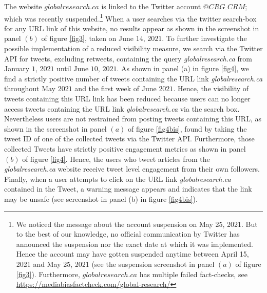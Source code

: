 \documentclass{article}
\begin{document}
\smallskip




The website $globalresearch.ca$ is linked to the Twitter account {$@CRG\_CRM$}; which was recently suspended.\footnote{We noticed the message about the account suspension on May 25, 2021. But to the best of our knowledge, no official communication by Twitter has announced the suspension nor the exact date at which it was implemented. Hence the account may have gotten suspended anytime between April 15, 2021 and May 25, 2021 (see the suspension screenshot in panel $(a)$ of figure \ref{fig3}). Furthermore, $globalresearch.ca$ has multiple failed fact-checks, see \href{https://mediabiasfactcheck.com/global-research/}{https://mediabiasfactcheck.com/global-research/}} When a user searches via the twitter search-box for any URL link of this website, no results appear as shown in the screenshot in panel $(b)$ of figure \ref{fig3}, taken on June $14$, $2021$. To further investigate the possible implementation of a reduced visibility measure, we search via the Twitter API for tweets, excluding retweets, containing the query {\it globalresearch.ca} from January $1$, $2021$ until June $10$, $2021$.  As shown in panel (a) in figure \ref{fig4}, we find a strictly positive number of tweets containing the URL link {\it globalresearch.ca} throughout May $2021$ and the first week of June $2021$. Hence, the visibility of tweets containing this URL link has been reduced because users can no longer access tweets containing the URL link {\it globalresearch.ca} via the search box. Nevertheless users are not restrained from posting tweets containing this URL, as shown in the screenshot in panel $(a)$ of figure \ref{fig4bis}, found by taking the tweet ID of one of the collected tweets via the Twitter API. Furthermore, those collected Tweets have strictly positive engagement metrics as shown in panel $(b)$ of figure \ref{fig4}. Hence, the users who tweet articles from the {\it globalresearch.ca} website receive tweet level engagement from their own followers. Finally, when a user attempts to click on the URL link {\it globalresearch.ca} contained in the Tweet, a warning message appears and indicates that the link may be unsafe (see screenshot in panel (b) in figure \ref{fig4bis}). 
\end{document}
